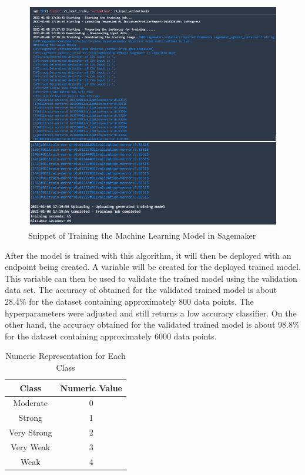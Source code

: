 \begin{figure} [ht]
    \centering
    \includegraphics[scale = 0.8]{pages/Chapter4/Chapter 4 Images/Training.PNG}
    \caption{Snippet of Training the Machine Learning Model in Sagemaker}
    \label{fig_train}
\end{figure}

After the model is trained with this algorithm, it will then be deployed with an endpoint being created. A variable will be created for the deployed trained model. This variable can then be used to validate the trained model using the validation data set. The accuracy of obtained for the validated trained model is about 28.4\% for the dataset containing approximately 800 data points. The hyperparameters were adjusted and still returns a low accuracy classifier.
On the other hand, the accuracy obtained for the validated trained model is about 98.8\% for the dataset containing approximately 6000 data points.

\begin{table}[ht]
\centering
\begin{center}
\begin{tabular}{ |c|c| } 
  \hline
 Class  & Numeric Value\\ 
  \hline\hline
Moderate & 0\\ 
Strong & 1\\ 
Very Strong & 2\\ 
Very Weak & 3\\ 
Weak & 4\\ 

 \hline
\end{tabular}
\caption{Numeric Representation for Each Class}
\label{table:class}
\end{center}
\end{table}

